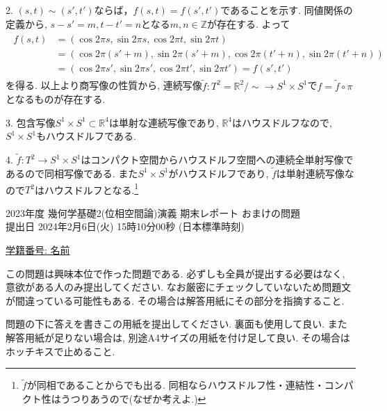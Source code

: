 \documentclass[dvipdfmx,a4paper,11pt]{article}
\newcommand{\R}{\mathbb{R}}
\newcommand{\Z}{\mathbb{Z}}
\theoremstyle{definition}
\begin{document}
{2. $(s,t) \sim (s' , t')$ならば，$f(s,t) = f(s', t')$であることを示す.
同値関係の定義から, $s-s' =m, t-t' = n$となる$m,n \in \Z$が存在する.
 よって
 \begin{align*}
 \begin{split}
f(s,t) &= (\cos 2 \pi s, \sin 2 \pi s,\cos 2 \pi t, \sin 2 \pi t) \\
&=
(\cos 2 \pi (s' +m), \sin 2 \pi (s' +m),\cos 2 \pi (t' +n), \sin 2 \pi (t' +n)) \\
&=
 (\cos 2 \pi s', \sin 2 \pi s',\cos 2 \pi t', \sin 2 \pi t')
=
f(s',t')  
\end{split}
\end{align*}
を得る. 以上より商写像の性質から, 連続写像$\widetilde{f}: T^2 = \R^2/\sim \rightarrow S^1 \times S^1$で$f = \widetilde{f} \circ \pi $となるものが存在する. 

3. 包含写像$S^1 \times S^1 \subset \R^4$は単射な連続写像であり, $\R^4$はハウスドルフなので, $S^1 \times S^1$もハウスドルフである.

4. $\widetilde{f}: T^2 \rightarrow S^1 \times S^1$はコンパクト空間からハウスドルフ空間への連続全単射写像であるので同相写像である. また$S^1 \times S^1$がハウスドルフであり, $\widetilde{f}$は単射連続写像なので$T^2$はハウスドルフとなる.\footnote{$\widetilde{f}$が同相であることからでも出る. 同相ならハウスドルフ性・連結性・コンパクト性はうつりあうので(なぜか考えよ.)}


  \newpage
  \begin{center}
{\Large 2023年度 幾何学基礎2(位相空間論)演義 期末レポート おまけの問題} \\

\vspace{5pt}
{ \large 提出日 2024年2月6日(火) 15時10分00秒 (日本標準時刻)}
\end{center}

\vspace{2pt}
\begin{flushleft}
{ \large \underline{学籍番号: \hspace{4cm} 名前  \hspace{8cm} } }
\end{flushleft}

この問題は興味本位で作った問題である. 必ずしも全員が提出する必要はなく, 意欲がある人のみ提出してください. 
なお厳密にチェックしていないため問題文が間違っている可能性もある. その場合は解答用紙にその部分を指摘すること. 

\vspace{5pt}
問題の下に答えを書きこの用紙を提出してください. 裏面も使用して良い. また解答用紙が足りない場合は, 別途A4サイズの用紙を付け足して良い. その場合はホッチキスで止めること. 
  
}
\end{document}
